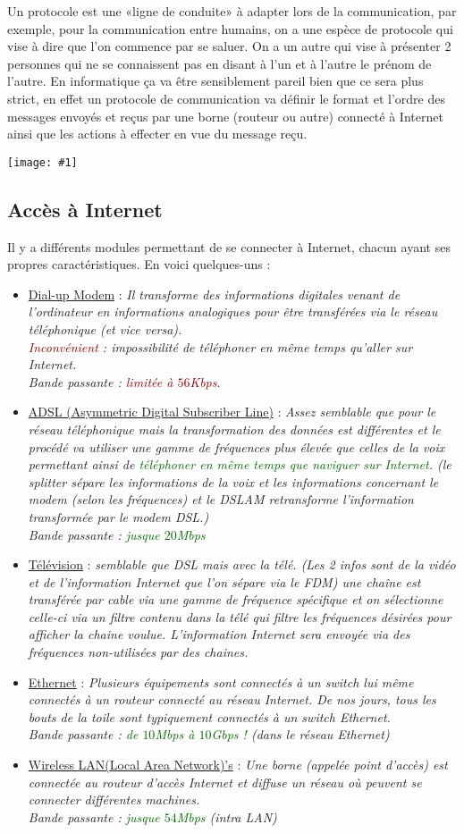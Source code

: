 \documentclass{article}
\newcommand{\gre}[1]{\textcolor{darkgreen}{#1}}
\newcommand{\ora}[1]{\textcolor{darko}{#1}}
\newcommand{\red}[1]{\textcolor{darkred}{#1}}
\newcommand{\imgR}[2]{\begin{center}\texttt{[image: \#1]}\end{center}}
\newcommand{\point}[2]{\item \ora{\underline{#1}} : \textit{#2}}
\begin{document}
Un protocole est une «ligne de conduite» à adapter lors de la communication, par exemple, pour la communication 
entre humains, on a une espèce de protocole qui vise à dire que l'on commence par se saluer. On a un autre qui 
vise à présenter 2 personnes qui ne se connaissent pas en disant à l'un et à l'autre le prénom de l'autre. En
informatique ça va être sensiblement pareil bien que ce sera plus strict, en effet un protocole de communication
va définir le format et l'ordre des messages envoyés et reçus par une borne (routeur ou autre) connecté à 
Internet ainsi que les actions à effecter en vue du message reçu.

\imgR{CN_001.png}{300}

\subsection{Accès à Internet}

Il y a différents modules permettant de se connecter à Internet, chacun ayant ses propres caractéristiques. En
voici quelques-uns :
\begin{itemize}
\point{Dial-up Modem}{Il transforme des informations digitales venant de l'ordinateur 
en informations analogiques pour être transférées via le réseau téléphonique (et vice versa). \\
\red{Inconvénient} : impossibilité de téléphoner en même temps qu'aller sur Internet.\\
Bande passante : \red{limitée à $56$Kbps}}.
\point{ADSL (Asymmetric Digital Subscriber Line)}{Assez semblable que pour le réseau 
téléphonique mais la transformation des données est différentes et le procédé va utiliser une gamme de fréquences
plus élevée que celles de la voix permettant ainsi de \gre{téléphoner en même temps que naviguer sur Internet}.
(le splitter sépare les informations de la voix et les informations concernant le modem (selon les fréquences)
et le DSLAM retransforme l'information transformée par le modem DSL.)\\ 
Bande passante : \gre{jusque $20$Mbps}}
\point{Télévision}{semblable que DSL mais avec la télé. (Les 2 infos sont de la vidéo et 
de l'information Internet que l'on sépare via le FDM) une chaîne est transférée par cable via une gamme de 
fréquence spécifique et on sélectionne celle-ci via un filtre contenu dans la télé qui filtre les fréquences 
désirées pour afficher la chaine voulue. L'information Internet sera envoyée via des fréquences non-utilisées par 
des chaines.}
\point{Ethernet}{Plusieurs équipements sont connectés à un switch lui même connectés à 
un routeur connecté au réseau Internet. De nos jours, tous les bouts de la toile sont typiquement connectés à un
switch Ethernet.\\
Bande passante : \gre{de $10$Mbps à $10$Gbps !} (dans le réseau Ethernet)}
\point{Wireless LAN(Local Area Network)'s}{Une borne (appelée point d'accès) est 
connectée au routeur d'accès Internet et diffuse un réseau où peuvent se connecter différentes machines. \\
Bande passante : \gre{jusque $54$Mbps} (intra LAN)}
\end{itemize}
\end{document}
